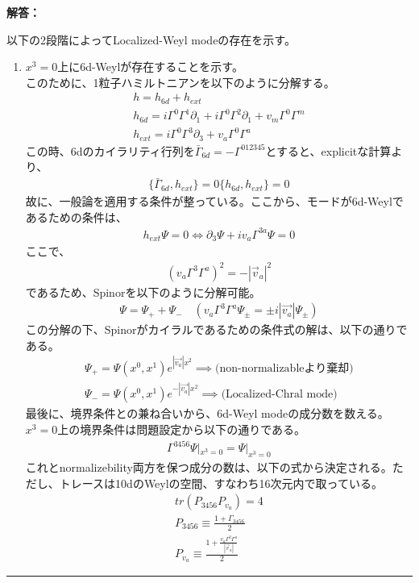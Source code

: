 \documentclass[dvipdfmx,a4paper,10.5pt]{article}
\numberwithin{equation}{section}
\newenvironment{answerbox}
{\begin{prooflabel}\textbf{解答：}\end{prooflabel}\vspace{0.8em}}
{\par\vspace{1em}\hrule\vspace{1em}}
\begin{document}
\begin{answerbox}
    以下の2段階によってLocalized-Weyl modeの存在を示す。
    \begin{enumerate}
        \item $x^{3}=0$上に6d-Weylが存在することを示す。\\
        このために、1粒子ハミルトニアンを以下のように分解する。
    \begin{gather*}
        h=h_{6d}+h_{ext}\\
        h_{6d}=i\Gamma^{0}\Gamma^{1}\partial_{1}+i\Gamma^{0}\Gamma^{2}\partial_{1}+v_{m}\Gamma^{0}\Gamma^{m}\\
        h_{ext}=i\Gamma^{0}\Gamma^{3}\partial_{3}+v_{a}\Gamma^{0}\Gamma^{a}
    \end{gather*}
    この時、6dのカイラリティ行列を$\bar{\Gamma}_{6d}=-\Gamma^{012345}$とすると、explicitな計算より、
    \begin{align*}
        \{\bar{\Gamma}_{6d},h_{ext}\}=0
        \{h_{6d},h_{ext}\}=0
    \end{align*}
    故に、一般論を適用する条件が整っている。ここから、モードが6d-Weylであるための条件は、
    \begin{align*}
        h_{ext}\Psi=0\iff \partial_{3}\Psi +iv_{a}\Gamma^{3a}\Psi=0
    \end{align*}
    ここで、
    \begin{align*}
        (v_{a}\Gamma^{3}\Gamma^{a})^{2}=-|\vec{v}_{a}|^{2}
    \end{align*}
    であるため、Spinorを以下のように分解可能。
    \begin{align*}
        \Psi=\Psi_{+}+\Psi_{-}\quad (v_{a}\Gamma^{3}\Gamma^{a}\Psi_{\pm}=\pm i|\vec{v_{a}}|\Psi_{\pm})
    \end{align*}
    この分解の下、Spinorがカイラルであるための条件式の解は、以下の通りである。
    \begin{align*}
        \Psi_{+}=\Psi(x^{0},x^{1})e^{|\vec{v_{a}}|x^{2}} \implies \text{(non-normalizableより棄却)}\\
        \Psi_{-}=\Psi(x^{0},x^{1})e^{-|\vec{v_{a}}|x^{2}}\implies \text{(Localized-Chral mode)}
    \end{align*}
    最後に、境界条件との兼ね合いから、6d-Weyl modeの成分数を数える。$x^{3}=0$上の境界条件は問題設定から以下の通りである。
    \begin{align*}
        \Gamma^{3456}\Psi|_{x^{3}=0}=\Psi|_{x^{3}=0}
    \end{align*}
    これとnormalizebility両方を保つ成分の数は、以下の式から決定される。ただし、トレースは10dのWeylの空間、すなわち16次元内で取っている。
    \begin{gather*}
        tr(P_{3456}P_{v_{a}})=4\\
        P_{3456} \equiv \frac{1+\Gamma_{3456}}{2}\\
        P_{v_{a}} \equiv \frac{ 1+\frac{v_{a}\Gamma^{2}\Gamma^{a}}{|\vec{v}_{a}|} }{2}
    \end{gather*}


\end{enumerate}
\end{answerbox}
\end{document}
